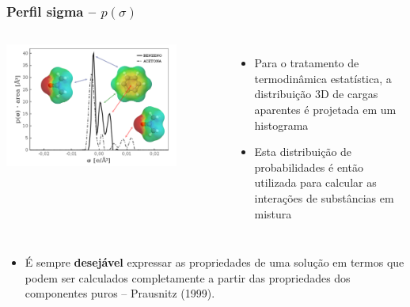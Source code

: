 \documentclass[aspectratio=169]{beamer}
\begin{document}
\begin{frame}
\frametitle{Perfil sigma -- $p(\sigma)$}
\begin{columns}[c]
\begin{center}
\includegraphics[width=0.8\textwidth]{img/perfilsigma}
\end{center}
\begin{itemize}
    \item Para o tratamento de termodinâmica estatística,
    	a distribuição 3D de cargas aparentes é projetada em um histograma
    \item Esta distribuição de probabilidades é então utilizada para
    	calcular as interações de substâncias em mistura
\end{itemize}
\end{columns}
\pause
\scriptsize
\begin{itemize}
\item É sempre \textbf{desejável} expressar as propriedades de uma solução
em termos que podem ser calculados completamente a partir das propriedades dos
componentes puros -- Prausnitz (1999).
\end{itemize}
\end{frame}
\end{document}
